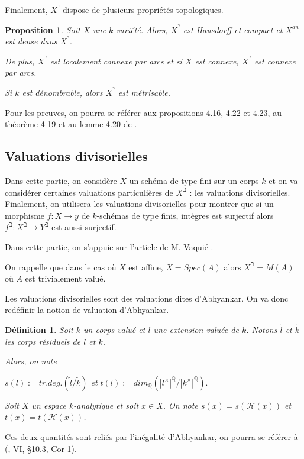 \documentclass[11pt]{article}
\newcommand{\Q}{\mathbb{Q}}
\newcommand{\h}{\mathcal{H}}
\newtheorem{prop}[thm]{Proposition}
\newtheorem{defi}[thm]{Définition}
\begin{document}
Finalement, $X^\urcorner$ dispose de plusieurs propriétés topologiques.
\begin{prop}
Soit $X$ une $k$-variété. Alors, $X^\urcorner$ est Hausdorff et compact et $X^{an}$ est dense dans $X^\urcorner$. 

De plus, $X^\urcorner$ est localement connexe par arcs et si $X$ est connexe, $X^\urcorner$ est connexe par arcs.

Si $k$ est dénombrable, alors $X^\urcorner$ est métrisable.
\end{prop}
Pour les preuves, on pourra se référer aux propositions 4.16, 4.22 et 4.23, au théorème 4
19 et au lemme 4.20 de \cite{PoineauCompactificationHybride}.

\subsection{Valuations divisorielles}
Dans cette partie, on considère $X$ un schéma de type fini sur un corps $k$ et on va considérer certaines valuations particulières de $X^\beth$ : les valuations divisorielles. Finalement, on utilisera les valuations divisorielles pour montrer que si un morphisme $f: X\rightarrow y$ de $k$-schémas de type finis, intègres est surjectif alors $f^\beth : X^\beth \rightarrow Y^\beth$ est aussi surjectif.

Dans cette partie, on s'appuie sur l'article de M. Vaquié \cite{VaquieValuations}.

On rappelle que dans le cas où $X$ est affine, $X = Spec(A)$ alors $X^\beth = M(A)$ où $A$ est trivialement valué. 

Les valuations divisorielles sont des valuations dites d'Abhyankar. On va donc redéfinir la notion de valuation d'Abhyankar.

\begin{defi}
Soit $k$ un corps valué et $l$ une extension valuée de $k$. Notons $\tilde{l}$ et $\tilde{k}$ les corps résiduels de $l$ et $k$.

Alors, on note 
\begin{center}
$s(l) := tr.deg.(\tilde{l}/\tilde{k})$ et $t(l) := dim_\Q(|l^\times|^\Q/|k^\times|^\Q).$ 
\end{center}
Soit $X$ un espace $k$-analytique et soit $x \in X$. On note $s(x) = s(\mathcal{H}(x))$ et $t(x) = t(\h(x))$.
\end{defi}

Ces deux quantités sont reliés par l'inégalité d'Abhyankar, on pourra se référer à (\cite{BourbakiAlgCom57}, VI, §10.3, Cor 1).
\end{document}
